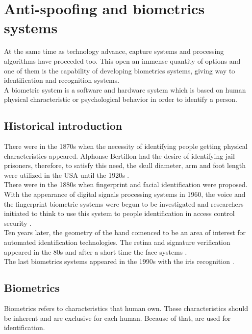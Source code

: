 \section{Anti-spoofing and biometrics systems}
At the same time as technology advance, capture systems and processing algorithms have proceeded too. This open an immense quantity of options and one of them is the capability of developing biometrics systems, giving way to identification and recognition systems.\\

A biometric system is a software and hardware system which is based on human physical characteristic or psychological behavior in order to identify a person.\\

\subsection{Historical introduction}
There were in the 1870s when the necessity of identifying people getting physical characteristics appeared. Alphonse Bertillon had the desire of identifying jail prisoners, therefore, to satisfy this need, the skull diameter, arm and foot length were utilized in the USA until the 1920s \cite{Intro_biometrics}.\\

There were in the 1880s when fingerprint and facial identification were proposed. With the appearance of digital signals processing systems in 1960, the voice and the fingerprint biometric systems were begun to be investigated and researchers initiated to think to use this system to people identification in access control security \cite{Intro_biometrics}.\\

Ten years later, the geometry of the hand comenced to be an area of interest for automated identification technologies. The retina and signature verification appeared in the 80s and after a short time the face systems \cite{Intro_biometrics}.\\

The last biometrics systems appeared in the 1990s with the iris recognition \cite{Intro_biometrics}.\\

\subsection{Biometrics}
Biometrics refers to characteristics that human own. These characteristics should be inherent and are exclusive for each human. Because of that, are used for identification.\\

